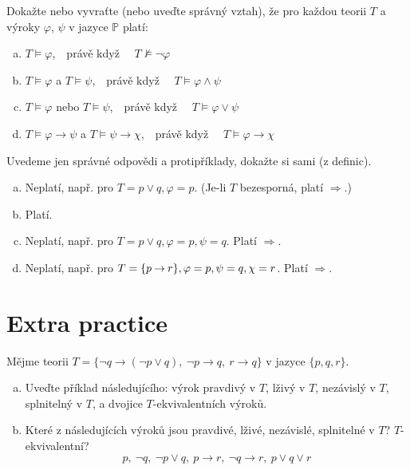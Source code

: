\begin{problem}

    Dokažte nebo vyvraťte (nebo uveďte správný vztah), že pro každou teorii $T$ a výroky $\varphi$, $\psi$ v jazyce $\mathbb{P}$ platí:
    \begin{enumerate}[(a)]
        \item $T \models \varphi$,\ \  právě když \ \ $T \not\models \neg \varphi$
        \item $T \models \varphi$ a $T \models \psi$,\ \ právě když \ \ $T \models \varphi \wedge \psi$
        \item $T \models \varphi$ nebo $T \models \psi$,\ \ právě když \ \ $T \models \varphi \vee \psi$
        \item $T \models \varphi \to \psi$ a $T \models \psi \to \chi$,\ \ právě když \ \ $T \models \varphi \to \chi$
    \end{enumerate}

    \begin{solution} 
        Uvedeme jen správné odpovědi a protipříklady, dokažte si sami (z definic).      
        \begin{enumerate}[(a)]
            \item Neplatí, např. pro $T=p\lor q,\varphi=p$. (Je-li $T$ bezesporná, platí $\Rightarrow$.)
            \item Platí.
            \item Neplatí, např. pro $T=p\lor q,\varphi=p,\psi=q$. Platí $\Rightarrow$.
            \item Neplatí, např. pro $T=\{p\mathbin{\rightarrow} r\},\varphi=p,\psi=q,\chi=r$. Platí $\Rightarrow$. 
        \end{enumerate}              
    \end{solution}
    
\end{problem}


\section*{Extra practice}


\begin{problem}
        
    Mějme teorii $T=\{\neg q \to (\neg p \vee q),\ \neg p \to q,\ r \to q\}$ v jazyce $\{p, q, r\}$.
    \begin{enumerate}[(a)]
        \item Uveďte příklad následujícího: výrok pravdivý v $T$, lživý v $T$, nezávislý v $T$, splnitelný v $T$, a dvojice $T$-ekvivalentních výroků.
        \item Které z následujících výroků jsou pravdivé, lživé, nezávislé, splnitelné v $T$? $T$-ekvivalentní? 
        $$
        p, \ \neg q, \ \neg p\vee q, \ p\to r,\ \neg q\to r, \ p\vee q\vee r
        $$
    \end{enumerate}

\end{problem}


